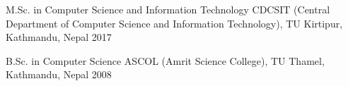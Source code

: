

\begin{cventries}

  \cventry
    {M.Sc. in Computer Science and Information Technology} %
    {CDCSIT (Central Department of Computer Science and Information Technology), TU} %
    {Kirtipur, Kathmandu, Nepal} %
    {2017} %
    {}  
    
    \cventry
    {B.Sc. in Computer Science} %
    {ASCOL (Amrit Science College), TU} %
    {Thamel, Kathmandu, Nepal} %
    {2008} %
    {}
\end{cventries}
